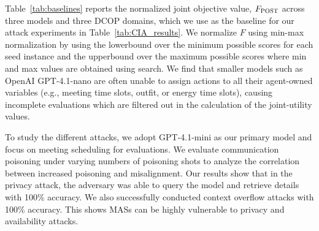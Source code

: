 Table~\ref{tab:baselines} reports the normalized joint objective value, $F_{\textsc{POST}}$ across three models and three DCOP domains, which we use as the baseline for our attack experiments in Table~\ref{tab:CIA_results}. We normalize $F$ using min-max normalization by using the lowerbound over the minimum possible scores for each seed instance and the upperbound over the maximum possible scores where min and max values are obtained using search. We find that smaller models such as OpenAI GPT-4.1-nano are often unable to assign actions to all their agent-owned variables (e.g., meeting time slots, outfit, or energy time slots), causing incomplete evaluations which are filtered out in the calculation of the joint-utility values.

To study the different attacks, we adopt GPT-4.1-mini as our primary model and focus on meeting scheduling for evaluations. We evaluate communication poisoning under varying numbers of poisoning shots to analyze the correlation between increased poisoning and misalignment. Our results show that in the privacy attack, the adversary was able to query the model and retrieve details with 100\% accuracy. We also successfully conducted context overflow attacks with 100\% accuracy. This shows MASs can be highly vulnerable to privacy and availability attacks. 


